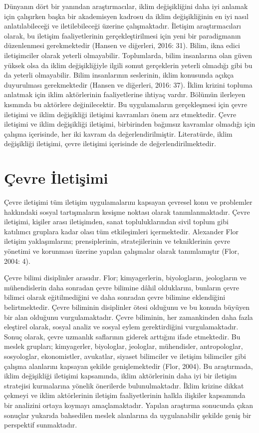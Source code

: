 \documentclass[
]{book}
\begin{document}
Dünyanın dört bir yanından araştırmacılar, iklim değişikliğini daha iyi anlamak için çalışırken başka bir akademisyen kadrosu da iklim değişikliğinin en iyi nasıl anlatılabileceği ve iletilebileceği üzerine çalışmaktadır. İletişim araştırmacıları olarak, bu iletişim faaliyetlerinin gerçekleştirilmesi için yeni bir paradigmanın düzenlenmesi gerekmektedir (Hansen ve diğerleri, 2016: 31). Bilim, ikna edici iletişimciler olarak yeterli olmayabilir. Toplumlarda, bilim insanlarına olan güven yüksek olsa da iklim değişikliğiyle ilgili somut gerçeklerin yeterli olmadığı gibi bu da yeterli olmayabilir. Bilim insanlarının seslerinin, iklim konusunda açıkça duyurulması gerekmektedir (Hansen ve diğerleri, 2016: 37). İklim krizini topluma anlatmak için iklim aktörlerinin faaliyetlerine ihtiyaç vardır. Bölümün ilerleyen kısmında bu aktörlere değinilecektir. Bu uygulamaların gerçekleşmesi için çevre iletişimi ve iklim değişikliği iletişimi kavramları önem arz etmektedir. Çevre iletişimi ve iklim değişikliği iletişimi, birbirinden bağımsız kavramlar olmadığı için çalışma içerisinde, her iki kavram da değerlendirilmiştir. Literatürde, iklim değişikliği iletişimi, çevre iletişimi içerisinde de değerlendirilmektedir.

\hypertarget{uxe7evre-iletiux15fimi}{%
\section{Çevre İletişimi}\label{uxe7evre-iletiux15fimi}}

Çevre iletişimi tüm iletişim uygulamalarını kapsayan çevresel konu ve problemler hakkındaki sosyal tartışmaların kesişme noktası olarak tanımlanmaktadır. Çevre iletişimi, kişiler arası iletişimden, sanat topluluklarından sivil toplum gibi katılımcı gruplara kadar olası tüm etkileşimleri içermektedir. Alexander Flor iletişim yaklaşımlarını; prensiplerinin, stratejilerinin ve tekniklerinin çevre yönetimi ve korunması üzerine yapılan çalışmalar olarak tanımlamıştır (Flor, 2004: 4).

Çevre bilimi disiplinler arasıdır. Flor; kimyagerlerin, biyologların, jeologların ve mühendislerin daha sonradan çevre bilimine dâhil olduklarını, bunların çevre bilimci olarak eğitilmediğini ve daha sonradan çevre bilimine eklendiğini belirtmektedir. Çevre biliminin disiplinler ötesi olduğunu ve bu konuda büyüyen bir alan olduğunu vurgulamaktadır. Çevre biliminin, her zamankinden daha fazla eleştirel olarak, sosyal analiz ve sosyal eylem gerektirdiğini vurgulamaktadır. Sonuç olarak, çevre uzmanlık saflarının giderek arttığını ifade etmektedir. Bu meslek grupları; kimyagerler, biyologlar, jeologlar, mühendisler, antropologlar, sosyologlar, ekonomistler, avukatlar, siyaset bilimciler ve iletişim bilimciler gibi çalışma alanlarını kapsayan şekilde genişlemektedir (Flor, 2004). Bu araştırmada, iklim değişikliği iletişimi kapsamında, iklim aktörlerinin daha iyi bir iletişim stratejisi kurmalarına yönelik önerilerde bulunulmaktadır. İklim krizine dikkat çekmeyi ve iklim aktörlerinin iletişim faaliyetlerinin halkla ilişkiler kapsamında bir analizini ortaya koymayı amaçlamaktadır. Yapılan araştırma sonucunda çıkan sonuçlar yukarıda bahsedilen meslek alanlarına da uygulanabilir şekilde geniş bir perspektif sunmaktadır.
\end{document}
